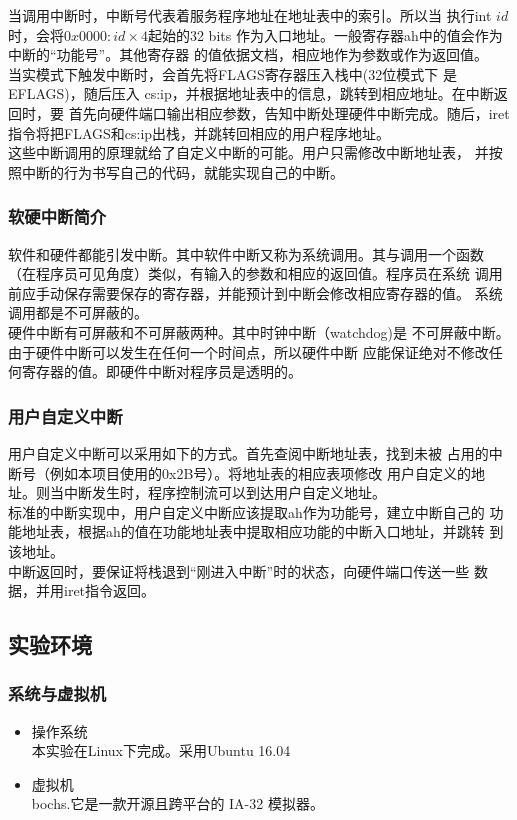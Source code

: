 \documentclass[a4paper]{article}
\begin{document}
    当调用中断时，中断号代表着服务程序地址在地址表中的索引。所以当
    执行int $id$时，会将$0x0000 : id \times 4$起始的32 bits
    作为入口地址。一般寄存器ah中的值会作为中断的``功能号''。其他寄存器
    的值依据文档，相应地作为参数或作为返回值。\\
    
    当实模式下触发中断时，会首先将FLAGS寄存器压入栈中(32位模式下
    是EFLAGS)，随后压入
    cs:ip，并根据地址表中的信息，跳转到相应地址。在中断返回时，要
    首先向硬件端口输出相应参数，告知中断处理硬件中断完成。随后，iret
    指令将把FLAGS和cs:ip出栈，并跳转回相应的用户程序地址。\\
    
    这些中断调用的原理就给了自定义中断的可能。用户只需修改中断地址表，
    并按照中断的行为书写自己的代码，就能实现自己的中断。 
    \subsubsection{软硬中断简介}
    软件和硬件都能引发中断。其中软件中断又称为系统调用。其与调用一个函数
    （在程序员可见角度）类似，有输入的参数和相应的返回值。程序员在系统
    调用前应手动保存需要保存的寄存器，并能预计到中断会修改相应寄存器的值。
    系统调用都是不可屏蔽的。\\ 
    
    硬件中断有可屏蔽和不可屏蔽两种。其中时钟中断（watchdog)是
    不可屏蔽中断。由于硬件中断可以发生在任何一个时间点，所以硬件中断
    应能保证绝对不修改任何寄存器的值。即硬件中断对程序员是透明的。
    \subsubsection{用户自定义中断}
    用户自定义中断可以采用如下的方式。首先查阅中断地址表，找到未被
    占用的中断号（例如本项目使用的0x2B号）。将地址表的相应表项修改
    用户自定义的地址。则当中断发生时，程序控制流可以到达用户自定义地址。\\
    
    标准的中断实现中，用户自定义中断应该提取ah作为功能号，建立中断自己的
    功能地址表，根据ah的值在功能地址表中提取相应功能的中断入口地址，并跳转
    到该地址。\\
    
    中断返回时，要保证将栈退到``刚进入中断''时的状态，向硬件端口传送一些
    数据，并用iret指令返回。
    \subsection{实验环境}
    \subsubsection{系统与虚拟机}
    \begin{itemize} \item 操作系统 \\ 
        本实验在Linux下完成。采用Ubuntu 16.04
        \item 虚拟机\\
        bochs.它是一款开源且跨平台的 IA-32 模拟器。
    \end{itemize}
\end{document}
